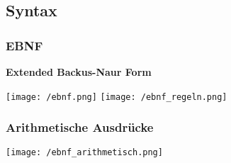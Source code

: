 \subsection{Syntax}
\subsubsection{EBNF}
\textbf{Extended Backus-Naur Form}
\begin{center}
    \texttt{[image: /ebnf.png]} 
    \texttt{[image: /ebnf\_regeln.png]} 
\end{center}
\subsubsection{Arithmetische Ausdrücke}
\begin{center}
    \texttt{[image: /ebnf\_arithmetisch.png]} 
\end{center}